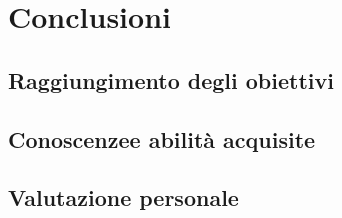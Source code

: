 
\chapter{Conclusioni}
\label{cap:conclusioni}

\section{Raggiungimento degli obiettivi}

\section{Conoscenzee abilità acquisite}

\section{Valutazione personale}
